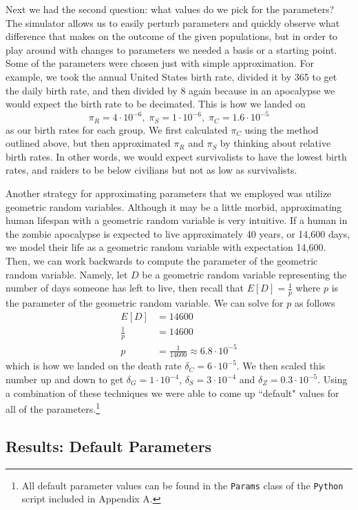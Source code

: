 \documentclass{article}
\begin{document}
Next we had the second question: what values do we pick for the parameters? The simulator allows us to easily perturb parameters and quickly observe what difference that makes on the outcome of the given populations, but in order to play around with changes to parameters we needed a basis or a starting point. Some of the parameters were chosen just with simple approximation. For example, we took the annual United States birth rate, divided it by 365 to get the daily birth rate, and then divided by 8 again because in an apocalypse we would expect the birth rate to be decimated. This is how we landed on
\[
    \pi_R = 4 \cdot 10^{-6},\; \pi_S = 1 \cdot 10^{-6},\; \pi_C = 1.6 \cdot 10^{-5} 
\]
as our birth rates for each group. We first calculated $\pi_C$ using the method outlined above, but then approximated $\pi_R$ and $\pi_S$ by thinking about relative birth rates. In other words, we would expect survivalists to have the lowest birth rates, and raiders to be below civilians but not as low as survivalists.

Another strategy for approximating parameters that we employed was utilize geometric random variables. Although it may be a little morbid, approximating human lifespan with a geometric random variable is very intuitive. If a human in the zombie apocalypse is expected to live approximately 40 years, or 14,600 days, we model their life as a geometric random variable with expectation 14,600. Then, we can work backwards to compute the parameter of the geometric random variable. Namely, let $D$ be a geometric random variable representing the number of days someone has left to live, then recall that $E[D] = \tfrac{1}{p}$ where $p$ is the parameter of the geometric random variable. We can solve for $p$ as follows
\begin{align*}
    E[D] &= 14600 \\
    \frac{1}{p} &= 14600 \\
    p &= \frac{1}{14600} \approx 6.8 \cdot 10^{-5}
\end{align*}
which is how we landed on the death rate $\delta_C = 6 \cdot 10^{-5}$. We then scaled this number up and down to get $\delta_G = 1 \cdot 10^{-4}$, $\delta_S = 3 \cdot 10^{-4}$ and $\delta_Z = 0.3 \cdot 10^{-5}$. Using a combination of these techniques we were able to come up ``default" values for all of the parameters.\footnote{All default parameter values can be found in the \texttt{Params} class of the \texttt{Python} script included in Appendix A.}

\subsection{Results: Default Parameters}
\end{document}
